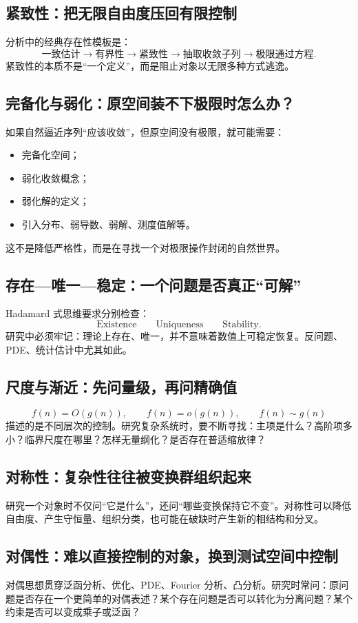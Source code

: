 \documentclass[11pt,a4paper]{ctexart}
\begin{document}
\subsection{紧致性：把无限自由度压回有限控制}
分析中的经典存在性模板是：
\[
\text{一致估计}
\to\text{有界性}
\to\text{紧致性}
\to\text{抽取收敛子列}
\to\text{极限通过方程}.
\]
紧致性的本质不是“一个定义”，而是阻止对象以无限多种方式逃逸。

\subsection{完备化与弱化：原空间装不下极限时怎么办？}
如果自然逼近序列“应该收敛”，但原空间没有极限，就可能需要：
\begin{itemize}
  \item 完备化空间；
  \item 弱化收敛概念；
  \item 弱化解的定义；
  \item 引入分布、弱导数、弱解、测度值解等。
\end{itemize}
这不是降低严格性，而是在寻找一个对极限操作封闭的自然世界。

\subsection{存在—唯一—稳定：一个问题是否真正“可解”}
Hadamard 式思维要求分别检查：
\[
\boxed{\text{Existence}}\qquad
\boxed{\text{Uniqueness}}\qquad
\boxed{\text{Stability}}.
\]
研究中必须牢记：理论上存在、唯一，并不意味着数值上可稳定恢复。反问题、PDE、统计估计中尤其如此。

\subsection{尺度与渐近：先问量级，再问精确值}
\[
f(n)=O(g(n)),\qquad f(n)=o(g(n)),\qquad f(n)\sim g(n)
\]
描述的是不同层次的控制。研究复杂系统时，要不断寻找：主项是什么？高阶项多小？临界尺度在哪里？怎样无量纲化？是否存在普适缩放律？

\subsection{对称性：复杂性往往被变换群组织起来}
研究一个对象时不仅问“它是什么”，还问“哪些变换保持它不变”。对称性可以降低自由度、产生守恒量、组织分类，也可能在破缺时产生新的相结构和分叉。

\subsection{对偶性：难以直接控制的对象，换到测试空间中控制}
对偶思想贯穿泛函分析、优化、PDE、Fourier 分析、凸分析。研究时常问：原问题是否存在一个更简单的对偶表述？某个存在问题是否可以转化为分离问题？某个约束是否可以变成乘子或泛函？
\end{document}

